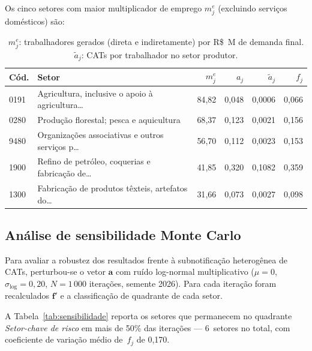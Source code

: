 \documentclass[12pt, a4paper]{article}
\begin{document}
  Os cinco setores com maior multiplicador de emprego $m^e_j$
  (excluindo serviços domésticos) são:

  \begin{table}[H]
  \centering
  \small
  \caption{Top-5 multiplicadores de emprego $m^e_j$, MIP-ES 2015}
  \label{tab:emprego}
  \begin{tabular}{lp{5.2cm}rrrr}
  \toprule
  \textbf{Cód.} & \textbf{Setor} & $m^e_j$ & $a_j$ & $\tilde{a}_j$ & $f_j$ \\
  \midrule
    0191 & Agricultura, inclusive o apoio à agricultura\ldots & 84{,}82 & 0{,}048 & 0{,}0006 & 0{,}066 \\
0280 & Produção florestal; pesca e aquicultura & 68{,}37 & 0{,}123 & 0{,}0021 & 0{,}156 \\
9480 & Organizações associativas e outros serviços p\ldots & 56{,}70 & 0{,}112 & 0{,}0023 & 0{,}153 \\
1900 & Refino de petróleo, coquerias e fabricação de\ldots & 41{,}85 & 0{,}320 & 0{,}1082 & 0{,}359 \\
1300 & Fabricação de produtos têxteis, artefatos do\ldots & 31{,}66 & 0{,}073 & 0{,}0027 & 0{,}098 \\
  \bottomrule
  \end{tabular}
  \caption*{\footnotesize $m^e_j$: trabalhadores gerados (direta e
  indiretamente) por R\$~M de demanda final. $\tilde{a}_j$: CATs por
  trabalhador no setor produtor.}
  \end{table}

  \subsection{Análise de sensibilidade Monte Carlo}

  Para avaliar a robustez dos resultados frente à subnotificação
  heterogênea de CATs, perturbou-se o vetor $\mathbf{a}$ com ruído
  log-normal multiplicativo ($\mu=0$, $\sigma_{\log}=0{,}20$, $N=1\,000$
  iterações, semente 2026). Para cada iteração foram recalculados
  $\mathbf{f}'$ e a classificação de quadrante de cada setor.

  A Tabela~\ref{tab:sensibilidade} reporta os setores que permanecem
  no quadrante \textit{Setor-chave de risco} em mais de 50\% das
  iterações --- 6~setores no total, com coeficiente de
  variação médio de~$f_j$ de 0{,}170.
\end{document}
